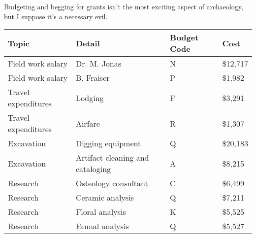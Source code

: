 Budgeting and begging for grants isn't the most exciting aspect of
archaeology, but I suppose it's a necessary evil.

\begin{center}
\begin{tabular}{llll}
\textbf{Topic}      & \textbf{Detail}                  & \textbf{Budget Code} & \textbf{Cost}     \\\hline
Field work salary   & Dr. M. Jonas                     & N           & \$12,717 \\
Field work salary   & B. Fraiser                       & P           & \$1,982  \\
Travel expenditures & Lodging                          & F           & \$3,291  \\
Travel expenditures & Airfare                          & R           & \$1,307  \\
Excavation          & Digging equipment                & Q           & \$20,183 \\
Excavation          & Artifact cleaning and cataloging & A           & \$8,215  \\
Research            & Osteology consultant             & C           & \$6,499  \\
Research            & Ceramic analysis                 & Q           & \$7,211  \\
Research            & Floral analysis                  & K           & \$5,525  \\
Research            & Faunal analysis                  & Q           & \$5,527 
\end{tabular}
\end{center}
